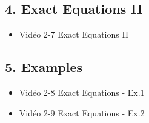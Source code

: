 \begin{multicols}{2}
\subsection*{4. Exact Equations II}

\begin{itemize}[label={$\bullet$}]
  \item Vidéo 2-7 Exact Equations II
\end{itemize}

\subsection*{5. Examples}

\begin{itemize}[label={$\bullet$}]
  \item Vidéo 2-8 Exact Equations - Ex.1
  \item Vidéo 2-9 Exact Equations - Ex.2
\end{itemize}

\end{multicols}

